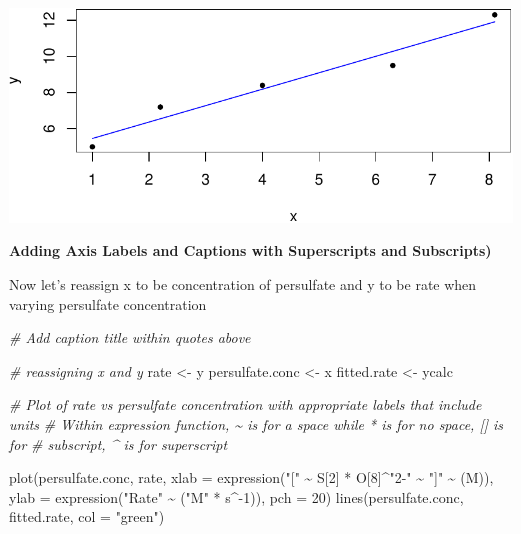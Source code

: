 \documentclass[
]{article}
\newenvironment{Shaded}{\begin{snugshade}}{\end{snugshade}}
\newcommand{\AttributeTok}[1]{\textcolor[rgb]{0.77,0.63,0.00}{#1}}
\newcommand{\CommentTok}[1]{\textcolor[rgb]{0.56,0.35,0.01}{\textit{#1}}}
\newcommand{\DecValTok}[1]{\textcolor[rgb]{0.00,0.00,0.81}{#1}}
\newcommand{\FunctionTok}[1]{\textcolor[rgb]{0.00,0.00,0.00}{#1}}
\newcommand{\NormalTok}[1]{#1}
\newcommand{\OtherTok}[1]{\textcolor[rgb]{0.56,0.35,0.01}{#1}}
\newcommand{\SpecialCharTok}[1]{\textcolor[rgb]{0.00,0.00,0.00}{#1}}
\newcommand{\StringTok}[1]{\textcolor[rgb]{0.31,0.60,0.02}{#1}}
\begin{document}
\includegraphics{skeleton_files/figure-latex/unnamed-chunk-5-4.pdf}

\textbf{Adding Axis Labels and Captions with Superscripts and
Subscripts)}

Now let's reassign x to be concentration of persulfate and y to be rate
when varying persulfate concentration

\begin{Shaded}
\begin{Highlighting}[]
\CommentTok{\# Add caption title within quotes above }

\CommentTok{\# reassigning x and y }
\NormalTok{rate }\OtherTok{\textless{}{-}}\NormalTok{ y}
\NormalTok{persulfate.conc }\OtherTok{\textless{}{-}}\NormalTok{ x}
\NormalTok{fitted.rate }\OtherTok{\textless{}{-}}\NormalTok{ ycalc}

\CommentTok{\# Plot of rate vs persulfate concentration with appropriate labels that include units}
\CommentTok{\# Within expression function, \textasciitilde{} is for a space while * is for no space, [] is for }
\CommentTok{\# subscript, \^{} is for superscript }

\FunctionTok{plot}\NormalTok{(persulfate.conc, rate,}
    \AttributeTok{xlab =} \FunctionTok{expression}\NormalTok{(}\StringTok{"["} \SpecialCharTok{\textasciitilde{}}\NormalTok{ S[}\DecValTok{2}\NormalTok{] }\SpecialCharTok{*}\NormalTok{ O[}\DecValTok{8}\NormalTok{]}\SpecialCharTok{\^{}}\StringTok{"2{-}"} \SpecialCharTok{\textasciitilde{}} \StringTok{"]"}  \SpecialCharTok{\textasciitilde{}}\NormalTok{ (M)),   }
    \AttributeTok{ylab =} \FunctionTok{expression}\NormalTok{(}\StringTok{"Rate"} \SpecialCharTok{\textasciitilde{}}\NormalTok{ (}\StringTok{"M"} \SpecialCharTok{*}\NormalTok{ s}\SpecialCharTok{\^{}{-}}\DecValTok{1}\NormalTok{)),}
     \AttributeTok{pch =} \DecValTok{20}\NormalTok{)}
\FunctionTok{lines}\NormalTok{(persulfate.conc, fitted.rate, }\AttributeTok{col =} \StringTok{"green"}\NormalTok{)}
\end{Highlighting}
\end{Shaded}
\end{document}
